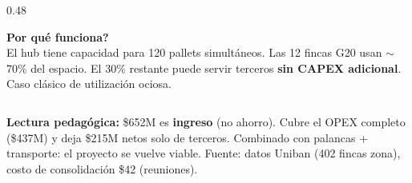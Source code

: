 \documentclass[aspectratio=169, 10pt]{beamer}
\begin{document}
\begin{frame}
\begin{columns}[T]
\begin{column}{0.48\textwidth}
\vspace{4pt}
\colorbox{verdeclaro}{\parbox{\dimexpr\linewidth-8pt}{\tiny\strut
\textcolor{verde}{\textbf{\textquestiondown Por qu\'e funciona?}}\\
El hub tiene capacidad para 120 pallets simult\'aneos. Las 12 fincas G20 usan $\sim$70\% del espacio.
El 30\% restante puede servir terceros \textbf{sin CAPEX adicional}. Caso cl\'asico de utilizaci\'on ociosa.\strut}}
\end{column}
\end{columns}

\vspace{4pt}
\colorbox{verdeclaro}{\parbox{\dimexpr\textwidth-12pt}{\tiny\strut
\textcolor{verde}{\textbf{Lectura pedag\'ogica:}} \$652M es \textbf{ingreso} (no ahorro). Cubre el OPEX completo (\$437M) y deja \$215M netos solo de terceros.
Combinado con palancas + transporte: el proyecto se vuelve viable. Fuente: datos Uniban (402 fincas zona), costo de consolidaci\'on \$42 (reuniones).\strut}}
\end{frame}
\end{document}
